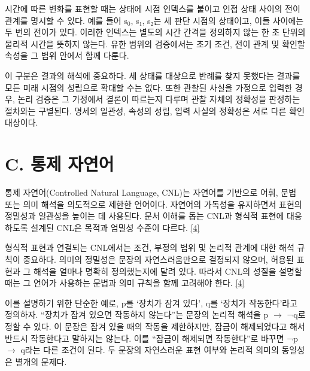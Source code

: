\documentclass[11pt,a4paper]{article}
\begin{document}
시간에 따른 변화를 표현할 때는 상태에 시점 인덱스를 붙이고 인접 상태 사이의 전이 관계를 명시할 수 있다. 예를 들어 s\ensuremath{{}_0}, s₁, s₂는 세 판단 시점의 상태이고, 이들 사이에는 두 번의 전이가 있다. 이러한 인덱스는 별도의 시간 간격을 정의하지 않는 한 초 단위의 물리적 시간을 뜻하지 않는다. 유한 범위의 검증에서는 초기 조건, 전이 관계 및 확인할 속성을 그 범위 안에서 함께 다룬다.\par

이 구분은 결과의 해석에 중요하다. 세 상태를 대상으로 반례를 찾지 못했다는 결과를 모든 미래 시점의 성립으로 확대할 수는 없다. 또한 관찰된 사실을 가정으로 입력한 경우, 논리 검증은 그 가정에서 결론이 따르는지 다루며 관찰 자체의 정확성을 판정하는 절차와는 구별된다. 명세의 일관성, 속성의 성립, 입력 사실의 정확성은 서로 다른 확인 대상이다.\par

\section*{C. 통제 자연어}

통제 자연어(Controlled Natural Language, CNL)는 자연어를 기반으로 어휘, 문법 또는 의미 해석을 의도적으로 제한한 언어이다. 자연어의 가독성을 유지하면서 표현의 정밀성과 일관성을 높이는 데 사용된다. 문서 이해를 돕는 CNL과 형식적 표현에 대응하도록 설계된 CNL은 목적과 엄밀성 수준이 다르다. \href{\detokenize{https://aclanthology.org/J14-1005/}}{[4]}\par

형식적 표현과 연결되는 CNL에서는 조건, 부정의 범위 및 논리적 관계에 대한 해석 규칙이 중요하다. 의미의 정밀성은 문장의 자연스러움만으로 결정되지 않으며, 허용된 표현과 그 해석을 얼마나 명확히 정의했는지에 달려 있다. 따라서 CNL의 성질을 설명할 때는 그 언어가 사용하는 문법과 의미 규칙을 함께 고려해야 한다. \href{\detokenize{https://aclanthology.org/J14-1005/}}{[4]}\par

이를 설명하기 위한 단순한 예로, p를 ‘장치가 잠겨 있다’, q를 ‘장치가 작동한다’라고 정의하자. “장치가 잠겨 있으면 작동하지 않는다”는 문장의 논리적 해석을 p \ensuremath{\rightarrow} ¬q로 정할 수 있다. 이 문장은 잠겨 있을 때의 작동을 제한하지만, 잠금이 해제되었다고 해서 반드시 작동한다고 말하지는 않는다. 이를 “잠금이 해제되면 작동한다”로 바꾸면 ¬p \ensuremath{\rightarrow} q라는 다른 조건이 된다. 두 문장의 자연스러운 표현 여부와 논리적 의미의 동일성은 별개의 문제다.\par
\end{document}
